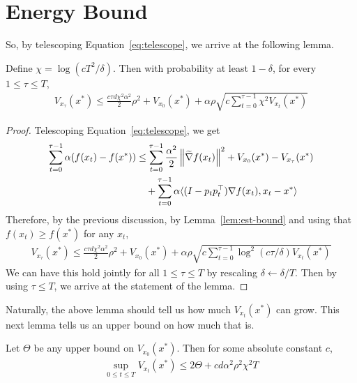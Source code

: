     \section{Energy Bound}
    So, by telescoping Equation~\eqref{eq:telescope}, we arrive at the following lemma.
    \begin{lemma}
        Define $\chi = \log(cT^2 / \delta)$. Then with probability at least $1-\delta$, for every $1 \leq \tau \leq T$,
        \begin{align*}
            V_{x_\tau}(x^*) \leq \frac{c \tau d \chi^{2} \alpha^2}{2} \rho^2 + V_{x_0}(x^*) + \alpha \rho \sqrt{c \sum_{t=0}^{\tau-1} \chi^{2} V_{x_t}(x^*)}
        \end{align*}
    \end{lemma}
\begin{proof}
    Telescoping Equation~\eqref{eq:telescope}, we get
    \begin{align*}
        \sum_{t=0}^{\tau-1} \alpha (f(x_t) - f(x^*)) &\leq \sum_{t=0}^{\tau-1} \frac{\alpha^2}{2} \left\lVert \widetilde{\nabla} f(x_t) \right\rVert^2 + V_{x_0}(x^*) - V_{x_\tau}(x^*) 
        \\&\quad+ \sum_{t=0}^{\tau-1} \alpha \langle (I-p_tp_t^\top) \nabla f(x_t), x_t - x^* \rangle 
    \end{align*}
    Therefore, by the previous discussion, by Lemma~\ref{lem:est-bound} and using that $f(x_t) \geq f(x^*)$ for any $x_t$,
    \begin{align*}
        V_{x_\tau}(x^*) \leq \frac{c\tau d \chi^{2} \alpha^2}{2} \rho^2 + V_{x_0}(x^*) + \alpha \rho \sqrt{c \sum_{t=0}^{\tau-1} \log^{2}(c\tau/\delta) V_{x_t}(x^*)}
    \end{align*}
    We can have this hold jointly for all $ 1 \leq \tau \leq T$ by rescaling $\delta \gets \delta/T$. Then by using $\tau \leq T$, we arrive at the statement of the lemma.
\end{proof}
Naturally, the above lemma should tell us how much $V_{x_t}(x^*)$ can grow. This next lemma tells us an upper bound on how much that is.
\begin{lemma}
    Let $\Theta$ be any upper bound on $V_{x_0}(x^*)$. Then for some absolute constant $c$,
    \begin{align*}
        \sup_{0 \leq t \leq T} V_{x_t}(x^*) \leq 2\Theta + cd\alpha^2 \rho^2  \chi^{2} T
    \end{align*}
\end{lemma}
